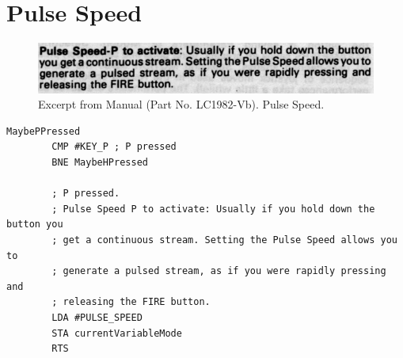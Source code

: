 \chapter{Pulse Speed} 
\lstset{style=6502Style}

\begin{figure}[H]
    \centering
    \begin{adjustbox}{width=10.5cm,margin=0cm}
      \includegraphics[width=12cm]{src/pulsespeed/pulsespeed.png}%
    \end{adjustbox}
    \caption{
      Excerpt from Manual (Part No. LC1982-Vb). Pulse Speed.
      }
\end{figure}

\begin{lstlisting}[caption=From \icode{CheckKeyboardInput}.]
MaybePPressed   
        CMP #KEY_P ; P pressed
        BNE MaybeHPressed

        ; P pressed.
        ; Pulse Speed P to activate: Usually if you hold down the button you
        ; get a continuous stream. Setting the Pulse Speed allows you to
        ; generate a pulsed stream, as if you were rapidly pressing and
        ; releasing the FIRE button.
        LDA #PULSE_SPEED
        STA currentVariableMode
        RTS 
\end{lstlisting}

